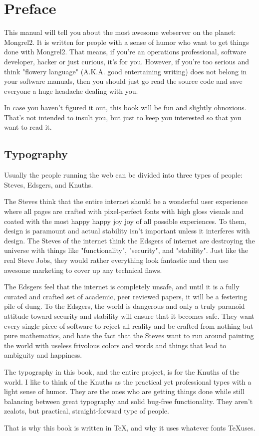 \chapter{Preface}

This manual will tell you about the most awesome webserver on the planet:
Mongrel2.  It is written for people with a sense of humor who want to get
things done with Mongrel2.  That means, if you're an operations professional,
software developer, hacker or just curious, it's for you.  However, if you're
too serious and think "flowery language" (A.K.A. good entertaining writing) does
not belong in your software manuals, then you should just go read the source
code and save everyone a huge headache dealing with you.

In case you haven't figured it out, this book will be fun and slightly
obnoxious.  That's not intended to insult you, but just to keep you interested
so that you want to read it.


\section{Typography}

Usually the people running the web can be divided into three types of people:  Steves,
Edsgers, and Knuths.

The Steves think that the entire internet should be a wonderful user experience
where all pages are crafted with pixel-perfect fonts with high gloss visuals
and coated with the most happy happy joy joy of all possible experiences.  To
them, design is paramount and actual stability isn't important unless it
interferes with design.  The Steves of the internet think the Edsgers of
internet are destroying the universe with things like "functionality",
"security", and "stability".  Just like the real Steve Jobs, they would rather
everything look fantastic and then use awesome marketing to cover up any
technical flaws.

The Edsgers feel that the internet is completely unsafe, and until it is a fully
curated and crafted set of academic, peer reviewed papers, it will be a festering
pile of dung.  To the Edsgers, the world is dangerous and only a truly paranoid
attitude toward security and stability will ensure that it becomes safe.  They
want every single piece of software to reject all reality and be crafted from
nothing but pure mathematics, and hate the fact that the Steves want to run
around painting the world with useless frivolous colors and words and things
that lead to ambiguity and happiness.

The typography in this book, and the entire project, is for the Knuths of the
world.  I like to think of the Knuths as the practical yet professional types
with a light sense of humor.  They are the ones who are getting things done
while still balancing between great typography and solid bug-free
functionality.  They aren't zealots, but practical, straight-forward type of
people.

That is why this book is written in \TeX, and why it uses whatever fonts \TeX uses.

